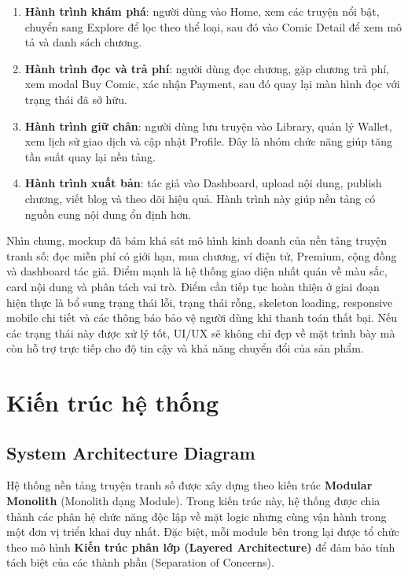 \begin{enumerate}
    \item \textbf{Hành trình khám phá}: người dùng vào Home, xem các truyện nổi bật, chuyển sang Explore để lọc theo thể loại, sau đó vào Comic Detail để xem mô tả và danh sách chương.
    \item \textbf{Hành trình đọc và trả phí}: người dùng đọc chương, gặp chương trả phí, xem modal Buy Comic, xác nhận Payment, sau đó quay lại màn hình đọc với trạng thái đã sở hữu.
    \item \textbf{Hành trình giữ chân}: người dùng lưu truyện vào Library, quản lý Wallet, xem lịch sử giao dịch và cập nhật Profile. Đây là nhóm chức năng giúp tăng tần suất quay lại nền tảng.
    \item \textbf{Hành trình xuất bản}: tác giả vào Dashboard, upload nội dung, publish chương, viết blog và theo dõi hiệu quả. Hành trình này giúp nền tảng có nguồn cung nội dung ổn định hơn.
\end{enumerate}

Nhìn chung, mockup đã bám khá sát mô hình kinh doanh của nền tảng truyện tranh số: đọc miễn phí có giới hạn, mua chương, ví điện tử, Premium, cộng đồng và dashboard tác giả. Điểm mạnh là hệ thống giao diện nhất quán về màu sắc, card nội dung và phân tách vai trò. Điểm cần tiếp tục hoàn thiện ở giai đoạn hiện thực là bổ sung trạng thái lỗi, trạng thái rỗng, skeleton loading, responsive mobile chi tiết và các thông báo bảo vệ người dùng khi thanh toán thất bại. Nếu các trạng thái này được xử lý tốt, UI/UX sẽ không chỉ đẹp về mặt trình bày mà còn hỗ trợ trực tiếp cho độ tin cậy và khả năng chuyển đổi của sản phẩm.

\section{Kiến trúc hệ thống}
\subsection{System Architecture Diagram}

Hệ thống nền tảng truyện tranh số được xây dựng theo kiến trúc \textbf{Modular Monolith} (Monolith dạng Module). Trong kiến trúc này, hệ thống được chia thành các phân hệ chức năng độc lập về mặt logic nhưng cùng vận hành trong một đơn vị triển khai duy nhất. Đặc biệt, mỗi module bên trong lại được tổ chức theo mô hình \textbf{Kiến trúc phân lớp (Layered Architecture)} để đảm bảo tính tách biệt của các thành phần (Separation of Concerns).

